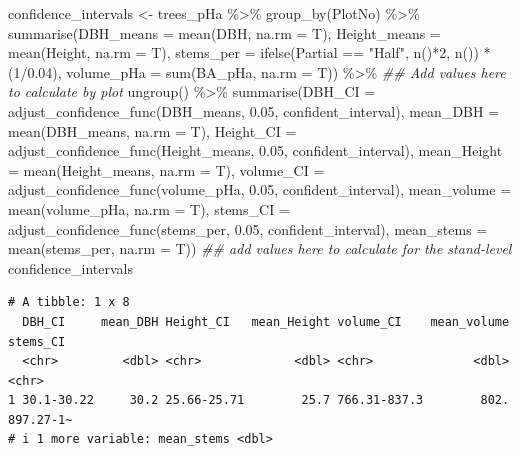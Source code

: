 \documentclass[
  letterpaper,
]{book}
\newenvironment{Shaded}{\begin{snugshade}}{\end{snugshade}}
\newcommand{\AttributeTok}[1]{\textcolor[rgb]{0.40,0.45,0.13}{#1}}
\newcommand{\DecValTok}[1]{\textcolor[rgb]{0.68,0.00,0.00}{#1}}
\newcommand{\DocumentationTok}[1]{\textcolor[rgb]{0.37,0.37,0.37}{\textit{#1}}}
\newcommand{\FloatTok}[1]{\textcolor[rgb]{0.68,0.00,0.00}{#1}}
\newcommand{\FunctionTok}[1]{\textcolor[rgb]{0.28,0.35,0.67}{#1}}
\newcommand{\NormalTok}[1]{\textcolor[rgb]{0.00,0.23,0.31}{#1}}
\newcommand{\OtherTok}[1]{\textcolor[rgb]{0.00,0.23,0.31}{#1}}
\newcommand{\SpecialCharTok}[1]{\textcolor[rgb]{0.37,0.37,0.37}{#1}}
\newcommand{\StringTok}[1]{\textcolor[rgb]{0.13,0.47,0.30}{#1}}
\begin{document}
\begin{Shaded}
\begin{Highlighting}[]
\NormalTok{confidence\_intervals }\OtherTok{\textless{}{-}}\NormalTok{ trees\_pHa }\SpecialCharTok{\%\textgreater{}\%} 
  \FunctionTok{group\_by}\NormalTok{(PlotNo) }\SpecialCharTok{\%\textgreater{}\%} 
  \FunctionTok{summarise}\NormalTok{(}\AttributeTok{DBH\_means =} \FunctionTok{mean}\NormalTok{(DBH, }\AttributeTok{na.rm =}\NormalTok{ T),}
            \AttributeTok{Height\_means =} \FunctionTok{mean}\NormalTok{(Height, }\AttributeTok{na.rm =}\NormalTok{ T),}
            \AttributeTok{stems\_per =} \FunctionTok{ifelse}\NormalTok{(Partial }\SpecialCharTok{==} \StringTok{"Half"}\NormalTok{, }\FunctionTok{n}\NormalTok{()}\SpecialCharTok{*}\DecValTok{2}\NormalTok{, }\FunctionTok{n}\NormalTok{()) }\SpecialCharTok{*}\NormalTok{ (}\DecValTok{1}\SpecialCharTok{/}\FloatTok{0.04}\NormalTok{), }
            \AttributeTok{volume\_pHa =} \FunctionTok{sum}\NormalTok{(BA\_pHa, }\AttributeTok{na.rm =}\NormalTok{ T)) }\SpecialCharTok{\%\textgreater{}\%}
  \DocumentationTok{\#\# Add values here to calculate by plot }
  \FunctionTok{ungroup}\NormalTok{() }\SpecialCharTok{\%\textgreater{}\%} 
  \FunctionTok{summarise}\NormalTok{(}\AttributeTok{DBH\_CI =} \FunctionTok{adjust\_confidence\_func}\NormalTok{(DBH\_means, }\FloatTok{0.05}\NormalTok{, confident\_interval),}
            \AttributeTok{mean\_DBH =} \FunctionTok{mean}\NormalTok{(DBH\_means, }\AttributeTok{na.rm =}\NormalTok{ T),}
            \AttributeTok{Height\_CI =} \FunctionTok{adjust\_confidence\_func}\NormalTok{(Height\_means, }\FloatTok{0.05}\NormalTok{, confident\_interval),}
            \AttributeTok{mean\_Height =} \FunctionTok{mean}\NormalTok{(Height\_means, }\AttributeTok{na.rm =}\NormalTok{ T),}
            \AttributeTok{volume\_CI =} \FunctionTok{adjust\_confidence\_func}\NormalTok{(volume\_pHa, }\FloatTok{0.05}\NormalTok{, confident\_interval),}
            \AttributeTok{mean\_volume =} \FunctionTok{mean}\NormalTok{(volume\_pHa, }\AttributeTok{na.rm =}\NormalTok{ T),}
            \AttributeTok{stems\_CI =} \FunctionTok{adjust\_confidence\_func}\NormalTok{(stems\_per, }\FloatTok{0.05}\NormalTok{, confident\_interval),}
            \AttributeTok{mean\_stems =} \FunctionTok{mean}\NormalTok{(stems\_per, }\AttributeTok{na.rm =}\NormalTok{ T))}
  \DocumentationTok{\#\# add values here to calculate for the stand{-}level }
\NormalTok{confidence\_intervals}
\end{Highlighting}
\end{Shaded}

\begin{verbatim}
# A tibble: 1 x 8
  DBH_CI     mean_DBH Height_CI   mean_Height volume_CI    mean_volume stems_CI 
  <chr>         <dbl> <chr>             <dbl> <chr>              <dbl> <chr>    
1 30.1-30.22     30.2 25.66-25.71        25.7 766.31-837.3        802. 897.27-1~
# i 1 more variable: mean_stems <dbl>
\end{verbatim}
\end{document}
